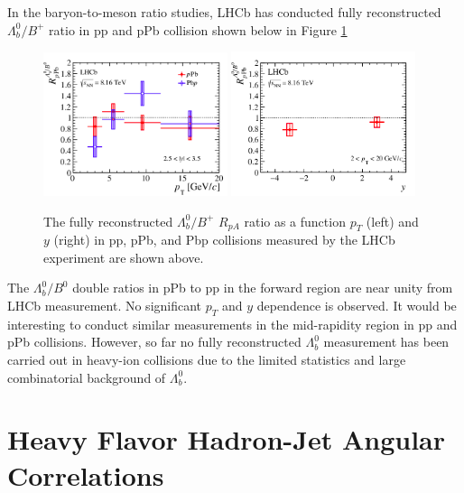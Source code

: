 In the baryon-to-meson ratio studies, LHCb has conducted fully reconstructed $\Lambda_b^0/B^+$ ratio in pp and pPb collision \cite{LHCbLambdaB} shown below in Figure \ref{LHCbLambda}


\begin{figure}[hbtp]
\begin{center}
\includegraphics[width=0.48\textwidth]{Figures/Chapter2/LHCbRpAPt.png}
\includegraphics[width=0.48\textwidth]{Figures/Chapter2/LHCbRpAy.png}
\caption{The fully reconstructed $\Lambda_b^0/B^+$ $R_{pA}$ ratio as a function $p_T$ (left) and $y$ (right) in pp, pPb, and Pbp collisions measured by the LHCb experiment are shown above.}
\label{LHCbLambda}
\end{center}
\end{figure}   

The $\Lambda_b^0/B^0$ double ratios in pPb to pp in the forward region are near unity from LHCb measurement. No significant $p_T$ and $y$ dependence is observed. It would be interesting to conduct similar measurements in the mid-rapidity region in pp and pPb collisions. However, so far no fully reconstructed $\Lambda_b^0$ measurement has been carried out in heavy-ion collisions due to the limited statistics and large combinatorial background of $\Lambda_b^0$. 



\section{Heavy Flavor Hadron-Jet Angular Correlations}

